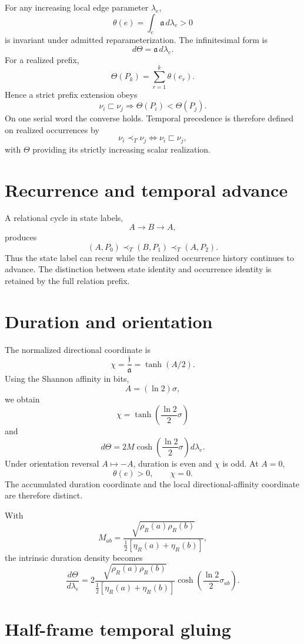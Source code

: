 For any increasing local edge parameter $\lambda_e$,
\[
\boxed{
\theta(e)=\int_e\mathfrak a\,d\lambda_e>0
}
\]
is invariant under admitted reparameterization. The infinitesimal form is
\[
\boxed{d\Theta=\mathfrak a\,d\lambda_e.}
\]
For a realized prefix,
\[
\boxed{
\Theta(P_k)=\sum_{r=1}^{k}\theta(e_r).
}
\]
Hence a strict prefix extension obeys
\[
\boxed{
\nu_i\sqsubset\nu_j
\Longrightarrow
\Theta(P_i)<\Theta(P_j).
}
\]
On one serial word the converse holds. Temporal precedence is therefore defined on realized occurrences by
\[
\boxed{
\nu_i\prec_T\nu_j
\iff
\nu_i\sqsubset\nu_j,
}
\]
with $\Theta$ providing its strictly increasing scalar realization.

\section{Recurrence and temporal advance}

A relational cycle in state labels,
\[
A\to B\to A,
\]
produces
\[
(A,P_0)\prec_T(B,P_1)\prec_T(A,P_2).
\]
Thus the state label can recur while the realized occurrence history continues to advance. The distinction between state identity and occurrence identity is retained by the full relation prefix.

\section{Duration and orientation}

The normalized directional coordinate is
\[
\boxed{
\chi=\frac{\mathfrak j}{\mathfrak a}=\tanh(A/2).
}
\]
Using the Shannon affinity in bits,
\[
A=(\ln2)\sigma,
\]
we obtain
\[
\boxed{
\chi=\tanh\!\left(\frac{\ln2}{2}\sigma\right)
}
\]
and
\[
\boxed{
d\Theta=2M\cosh\!\left(\frac{\ln2}{2}\sigma\right)d\lambda_e.}
\]
Under orientation reversal $A\mapsto-A$, duration is even and $\chi$ is odd. At $A=0$,
\[
\boxed{\theta(e)>0,\qquad \chi=0.}
\]
The accumulated duration coordinate and the local directional-affinity coordinate are therefore distinct.

With
\[
M_{ab}
=\frac{\sqrt{\rho_R(a)\rho_R(b)}}{\tfrac12[\eta_R(a)+\eta_R(b)]},
\]
the intrinsic duration density becomes
\[
\boxed{
\frac{d\Theta}{d\lambda_e}
=
2\frac{\sqrt{\rho_R(a)\rho_R(b)}}{\tfrac12[\eta_R(a)+\eta_R(b)]}
\cosh\!\left(\frac{\ln2}{2}\sigma_{ab}\right).
}
\]

\section{Half-frame temporal gluing}

